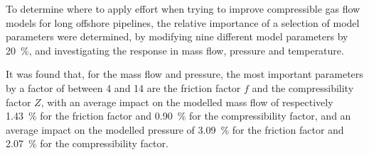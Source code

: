 
To determine where to apply effort when trying to improve compressible gas flow models for long offshore pipelines, the relative importance of a selection of model parameters were determined, by modifying nine different model parameters by \SI{20}{\percent}, and investigating the response in mass flow, pressure and temperature.

It was found that, for the mass flow and pressure, the most important parameters by a factor of between 4 and 14 are the friction factor $f$ and the compressibility factor $Z$, with an average impact on the modelled mass flow of respectively \SI{1.43}{\percent} for the friction factor and \SI{0.90}{\percent} for the compressibility factor, and an average impact on the modelled pressure of \SI{3.09}{\percent} for the friction factor and \SI{2.07}{\percent} for the compressibility factor.

